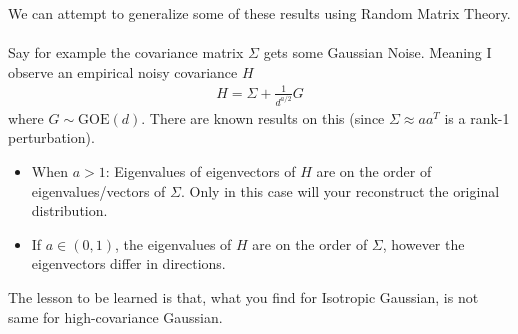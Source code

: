 \begin{sidework}
	We can attempt to generalize some of these results using Random Matrix Theory.\\
	\\
	Say for example the covariance matrix $\Sigma$ gets some Gaussian Noise. Meaning I observe an empirical noisy covariance $H$
	\begin{align}
		H = \Sigma + \frac{1}{d^{a/2}} G
	\end{align}
	where $G \sim \text{GOE}(d)$. There are known results on this (since $\Sigma \approx aa^T$ is a rank-1 perturbation).
	\begin{itemize}
		\item When $a > 1$: Eigenvalues of eigenvectors of $H$ are on the order of eigenvalues/vectors of $\Sigma$. Only in this case will your reconstruct the original distribution.
		\item If $a \in (0,1)$, the eigenvalues of $H$ are on the order of $\Sigma$, however the eigenvectors differ in directions.
	\end{itemize}
	The lesson to be learned is that, what you find for Isotropic Gaussian, is not same for high-covariance Gaussian.
\end{sidework}





























